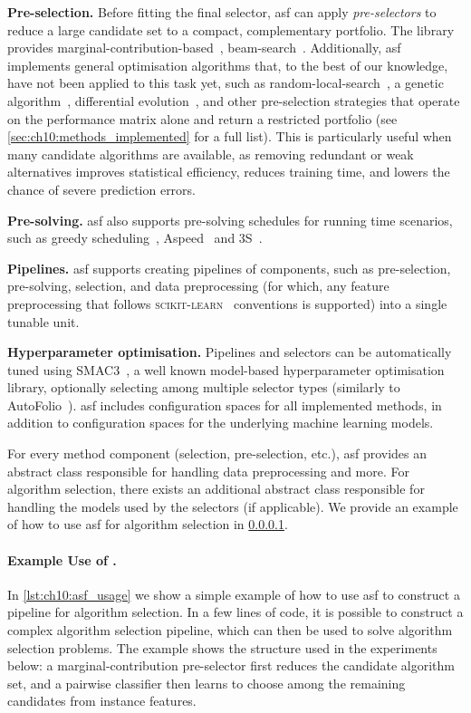 \textbf{Pre-selection.}
Before fitting the final selector, \gls{asf} can apply \emph{pre-selectors} to reduce a large candidate set to a compact, complementary portfolio.
The library provides marginal-contribution-based~\citep{XuEtAl08}, beam-search~\citep{BacEtAl22}. Additionally, \gls{asf} implements general optimisation algorithms that, to the best of our knowledge, have not been applied to this task yet, such as random-local-search~\citep{HutEtAl11}, a genetic algorithm~\citep{FraBur70}, differential evolution~\citep{PriEtAl05}, and other pre-selection strategies that operate on the performance matrix alone and return a restricted portfolio (see \cref{sec:ch10:methods_implemented} for a full list).
This is particularly useful when many candidate algorithms are available, as removing redundant or weak alternatives improves statistical efficiency, reduces training time, and lowers the chance of severe prediction errors.

\textbf{Pre-solving.}
\gls{asf} also supports pre-solving schedules for running time scenarios, such as greedy scheduling~\citep{XuEtAl08}, Aspeed~\citep{HooEtAl12} and 3S~\citep{KadEtAl11}.

\textbf{Pipelines.} \gls{asf} supports creating pipelines of components, such as pre-selection, pre-solving, selection, and data preprocessing (for which, any feature preprocessing that follows \textsc{scikit-learn}~\citep{PedEtAl11} conventions is supported) into a single tunable unit.

\textbf{Hyperparameter optimisation.}
Pipelines and selectors can be automatically tuned using SMAC3~\citep{HutEtAl11,LinEtAl22b}, a well known model-based hyperparameter optimisation library, optionally selecting among multiple selector types (similarly to AutoFolio~\citep{LinEtAl15}). \gls{asf} includes configuration spaces for all implemented methods, in addition to configuration spaces for the underlying machine learning models.

For every method component (selection, pre-selection, etc.), \gls{asf} provides an abstract class responsible for handling data preprocessing and more. For algorithm selection, there exists an additional abstract class responsible for handling the models used by the selectors (if applicable). We provide an example of how to use \gls{asf} for algorithm selection in \cref{sec:ch10:asf_usage_appendix}.

\paragraph{Example Use of .}
\label{sec:ch10:asf_usage_appendix}
In \cref{lst:ch10:asf_usage} we show a simple example of how to use \gls{asf} to construct a pipeline for algorithm selection. In a few lines of code, it is possible to construct a complex algorithm selection pipeline, which can then be used to solve algorithm selection problems. The example shows the structure used in the experiments below: a marginal-contribution pre-selector first reduces the candidate algorithm set, and a pairwise classifier then learns to choose among the remaining candidates from instance features.

